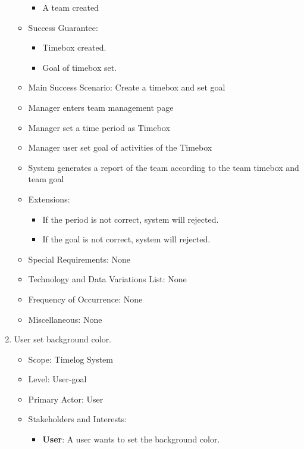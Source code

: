 \documentclass[12pt, a4paper]{article}
\begin{document}
\begin{CJK*}{UTF8}{bkai}
\begin{enumerate}
\begin{itemize}
            \begin{itemize}
              \item A team created
            \end{itemize}
          \item Success Guarantee:
            \begin{itemize}
              \item Timebox created.
              \item Goal of timebox set.
            \end{itemize}
          \item Main Success Scenario: Create a timebox and set goal
            \item Manager enters team management page
            \item Manager set a time period as Timebox
            \item Manager user set goal of activities of the Timebox
            \item System generates a report of the team according to the team timebox and team goal
          \item Extensions:
            \begin{itemize}
              \item If the period is not correct, system will rejected.
              \item If the goal is not correct, system will rejected.
            \end{itemize}
          \item Special Requirements: None
          \item Technology and Data Variations List: None
          \item Frequency of Occurrence: None
          \item Miscellaneous: None
        \end{itemize}
      \item User set background color.
        \begin{itemize}
          \item Scope: Timelog System
          \item Level: User-goal
          \item Primary Actor: User
          \item Stakeholders and Interests:
            \begin{itemize}
              \item {\bf User}: A user wants to set the background color.
            \end{itemize}

\end{itemize}
\end{enumerate}
\end{CJK*}
\end{document}
